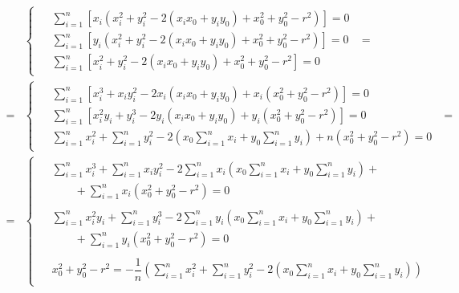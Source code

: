 \begin{align}
    \nonumber
    &\begin{cases}
         \begin{aligned}
             &\sum_{i=1}^{n} \left[ x_i \left(
             x_i^2 + y_i^2 - 2 (x_i x_0 + y_i y_0) + x_0^2 + y_0^2 - r^2 \right) \right] = 0 \\
             &\sum_{i=1}^{n} \left[ y_i \left(
             x_i^2 + y_i^2 - 2 (x_i x_0 + y_i y_0) + x_0^2 + y_0^2 - r^2 \right) \right] = 0 \\
             &\sum_{i=1}^{n} \left[
             x_i^2 + y_i^2 - 2 (x_i x_0 + y_i y_0) + x_0^2 + y_0^2 - r^2 \right] = 0
         \end{aligned}
    \end{cases} = \\ \nonumber
    = &\begin{cases}
           \begin{aligned}
               &\sum_{i=1}^{n} \left[
               x_i^3 + x_i y_i^2 - 2 x_i (x_i x_0 + y_i y_0)
               + x_i \left( x_0^2 + y_0^2 - r^2 \right) \right] = 0 \\
               &\sum_{i=1}^{n} \left[
               x_i^2 y_i + y_i^3 - 2 y_i (x_i x_0 + y_i y_0)
               + y_i \left( x_0^2 + y_0^2 - r^2 \right) \right] = 0 \\
               &\sum_{i=1}^{n} x_i^2 + \sum_{i=1}^{n} y_i^2
               - 2 \left( x_0 \sum_{i=1}^{n} x_i + y_0 \sum_{i=1}^{n} y_i \right)
               + n \left( x_0^2 + y_0^2 - r^2 \right) = 0
           \end{aligned}
    \end{cases} = \\
    = &\begin{cases}
           \label{eq:FindDetail:Circle_MNK_full_system}
           \begin{aligned}
               &\sum_{i=1}^{n} x_i^3 + \sum_{i=1}^{n} x_i y_i^2
               - 2 \sum_{i=1}^{n} x_i \left( x_0 \sum_{i=1}^{n} x_i + y_0 \sum_{i=1}^{n} y_i \right) + \\
               &\qquad + \sum_{i=1}^{n} x_i \left( x_0^2 + y_0^2 - r^2 \right) = 0 \\
               \\
               &\sum_{i=1}^{n} x_i^2 y_i + \sum_{i=1}^{n} y_i^3
               - 2 \sum_{i=1}^{n} y_i \left( x_0 \sum_{i=1}^{n} x_i + y_0 \sum_{i=1}^{n} y_i \right) + \\
               &\qquad + \sum_{i=1}^{n} y_i \left( x_0^2 + y_0^2 - r^2 \right) = 0 \\
               \\
               &x_0^2 + y_0^2 - r^2 = - \dfrac{1}{n} \left(
               \sum_{i=1}^{n} x_i^2 + \sum_{i=1}^{n} y_i^2
               - 2 \left( x_0 \sum_{i=1}^{n} x_i
               + y_0 \sum_{i=1}^{n} y_i \right)\right)
           \end{aligned}
    \end{cases}
\end{align} \\

